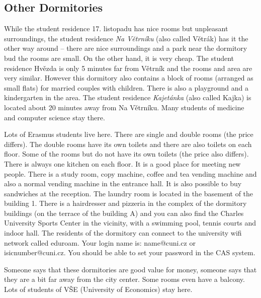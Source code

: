 \subsection{Other Dormitories}
While the student residence 17. listopadu has nice rooms but unpleasant
surroundings, the student residence \textit{Na
Větrníku} (also called Větrák) has it the other way around -- there are nice
surroundings and a park near the dormitory bud the rooms are small. On the other
hand, it is very cheap.
The student residence Hvězda is only 5 minutes far from Větrník and the rooms
and area are very similar. However this dormitory also contains a block of rooms
(arranged as small flats) for married couples with children. There is also a
playground and a kindergarten in the area.
The student residence \textit{Kajetánka} (also called Kajka) is located about 20
minutes away from Na Větrníku. Many students of medicine and computer science
stay there.

Lots of Erasmus students live here. There are single and double rooms (the price
differs). The double rooms have its own toilets and there are also toilets on
each floor. Some of the rooms but do not have its own toilets (the price also
differs).
There is always one kitchen on each floor. It is a good place for meeting new
people.
There is a study room, copy machine, coffee and tea vending machine and also a
normal vending machine in the entrance hall. It is also possible to buy
sandwiches at the reception.
The laundry room is located in the basement of the building 1.
There is a hairdresser and pizzeria in the complex of the dormitory buildings
(on the terrace of the building A) and you can also find the Charles University
Sports Center in the vicinity, with a swimming pool, tennis courts and indoor
hall.
The residents of the dormitory can connect to the university wifi network called
eduroam. Your login name is: name@cuni.cz or isicnumber@cuni.cz. You should be
able to set your password in the CAS system.

Someone says that these dormitories are good value for money, someone says that
they are a bit far away from the city center. Some rooms even have a balcony.
Lots of students of VŠE (University of Economics) stay here.

